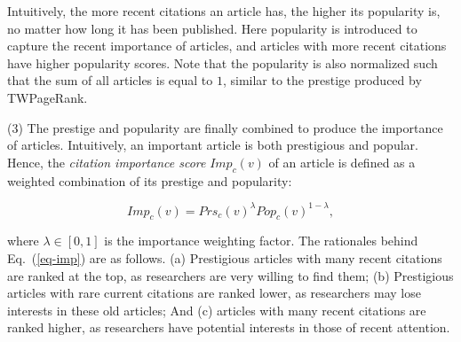 
Intuitively, the more recent citations an article has, the higher its popularity is, no matter how long it has been published.
Here popularity is introduced to capture the recent importance of articles, and articles with more recent citations have higher popularity scores. %
%
%
Note that the popularity is also normalized such that the sum of  all articles is equal to $1$, similar to the prestige produced by TWPageRank.

\sstab(3) The prestige and popularity are finally combined to produce the importance of articles. Intuitively, an important article is both prestigious and popular. Hence, the {\em citation importance score} $Imp_c(v)$ of an article is defined as a weighted combination of its prestige and popularity:

\vspace{-1ex}
\begin{small}
\begin{equation}\label{eq-imp}
Imp_c(v) = Prs_c(v)^\lambda Pop_c(v)^{1-\lambda},
\end{equation}
\end{small}
\noindent where $\lambda \in [0,1]$ is the importance weighting factor.
The rationales behind Eq.~(\ref{eq-imp}) are as follows. (a) Prestigious articles with many recent citations are ranked at the top, as researchers are very willing to find them; (b) Prestigious articles with rare current citations are ranked lower, as researchers may lose interests in these old articles; And (c) articles with many recent citations are ranked higher, as researchers have potential interests in those of recent attention.

